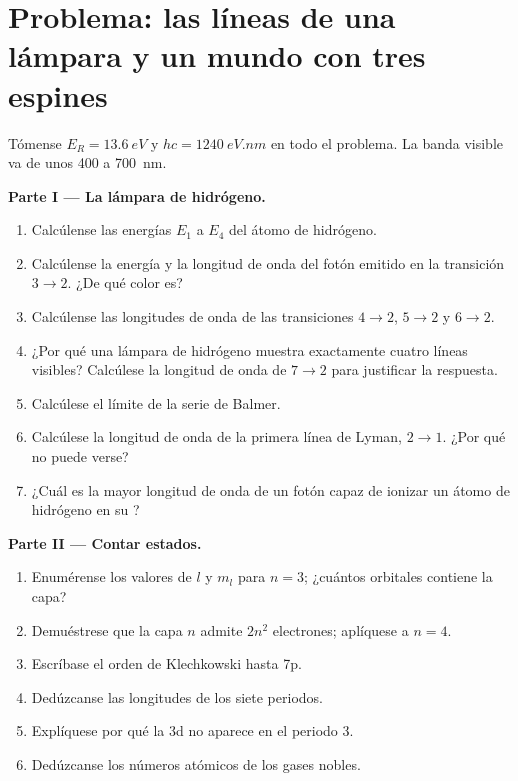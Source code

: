 \section{Problema: las líneas de una lámpara y un mundo con tres espines}

\begin{problem}
\label{pb:b1:quantum-numbers:1}
Tómense $E_R = \qty{13.6}{eV}$ y $hc = \qty{1240}{eV.nm}$ en todo el
problema. La banda visible va de unos 400 a \qty{700}{nm}.

\medskip
\noindent\textbf{Parte I --- La lámpara de hidrógeno.}
\begin{enumerate}
  \item Calcúlense las energías $E_1$ a $E_4$ del átomo de hidrógeno.
  \item Calcúlense la energía y la longitud de onda del fotón emitido en
        la transición $3 \to 2$. ¿De qué color es?
  \item Calcúlense las longitudes de onda de las transiciones $4 \to 2$,
        $5 \to 2$ y $6 \to 2$.
  \item ¿Por qué una lámpara de hidrógeno muestra exactamente cuatro
        líneas visibles? Calcúlese la longitud de onda de $7 \to 2$ para
        justificar la respuesta.
  \item Calcúlese el límite de la serie de Balmer.
  \item Calcúlese la longitud de onda de la primera línea de Lyman,
        $2 \to 1$. ¿Por qué no puede verse?
  \item ¿Cuál es la mayor longitud de onda de un fotón capaz de ionizar
        un átomo de hidrógeno en su ?
\end{enumerate}

\medskip
\noindent\textbf{Parte II --- Contar estados.}
\begin{enumerate}[resume]
  \item Enumérense los valores de $l$ y $m_l$ para $n = 3$; ¿cuántos
        orbitales contiene la capa?
  \item Demuéstrese que la capa $n$ admite $2n^2$ electrones; aplíquese a
        $n = 4$.
  \item Escríbase el orden de Klechkowski hasta 7p.
  \item Dedúzcanse las longitudes de los siete periodos.
  \item Explíquese por qué la  3d no aparece en el periodo 3.
  \item Dedúzcanse los números atómicos de los gases nobles.
\end{enumerate}


\end{problem}
